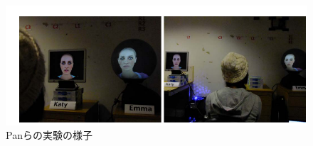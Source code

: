 \begin{figure}[tp]
  \centering
  \includegraphics[scale=0.6]{fig/avaterexp.png}
  \caption{Panらの実験の様子\cite{26}}\label{avaterexp}
\end{figure}


